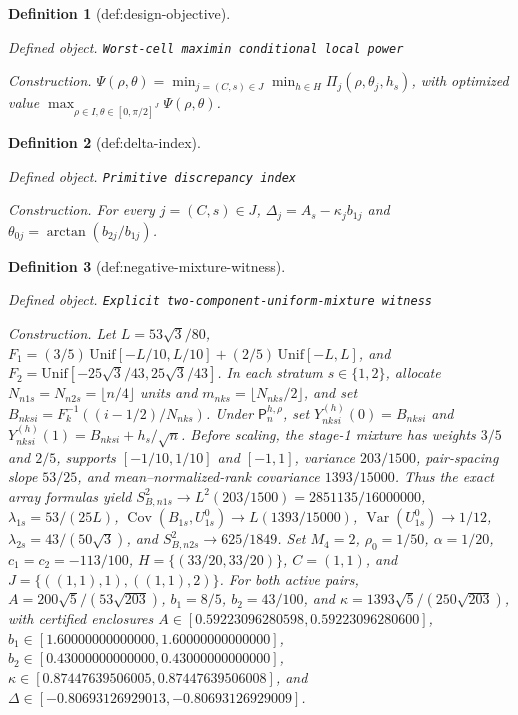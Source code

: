 \documentclass{article}
\newtheorem{definition}{Definition}
\begin{document}
\begin{definition}[def:design-objective]\label{def:design-objective}
\par\smallskip\noindent\emph{Defined object.} \texttt{Worst-\allowbreak{}cell maximin conditional local power}
\par\smallskip\noindent\emph{Construction.} \(\Psi(\rho,\theta)=\min_{j=(C,s)\in J}\min_{h\in H}\Pi_j(\rho,\theta_j,h_s)\), with optimized value \(\max_{\rho\in I,\theta\in[0,\pi/2]^J}\Psi(\rho,\theta)\).
\end{definition}

\begin{definition}[def:delta-index]\label{def:delta-index}
\par\smallskip\noindent\emph{Defined object.} \texttt{Primitive discrepancy index}
\par\smallskip\noindent\emph{Construction.} For every \(j=(C,s)\in J\), \(\Delta_j=A_s-\kappa_jb_{1j}\) and \(\theta_{0j}=\arctan(b_{2j}/b_{1j})\).
\end{definition}

\begin{definition}[def:negative-mixture-witness]\label{def:negative-mixture-witness}
\par\smallskip\noindent\emph{Defined object.} \texttt{Explicit two-\allowbreak{}component-\allowbreak{}uniform-\allowbreak{}mixture witness}
\par\smallskip\noindent\emph{Construction.} Let \(L=53\sqrt3/80\), \(F_1=(3/5)\,\mathrm{Unif}[-L/10,L/10]+(2/5)\,\mathrm{Unif}[-L,L]\), and \(F_2=\mathrm{Unif}[-25\sqrt3/43,25\sqrt3/43]\). In each stratum \(s\in\{1,2\}\), allocate \(N_{n1s}=N_{n2s}=\lfloor n/4\rfloor\) units and \(m_{nks}=\lfloor N_{nks}/2\rfloor\), and set \(B_{nksi}=F_k^{-1}((i-1/2)/N_{nks})\). Under \(\mathsf P_n^{h,\rho}\), set \(Y^{(h)}_{nksi}(0)=B_{nksi}\) and \(Y^{(h)}_{nksi}(1)=B_{nksi}+h_s/\sqrt n\). Before scaling, the stage-1 mixture has weights \(3/5\) and \(2/5\), supports \([-1/10,1/10]\) and \([-1,1]\), variance \(203/1500\), pair-spacing slope \(53/25\), and mean--normalized-rank covariance \(1393/15000\). Thus the exact array formulas yield \(S^2_{B,n1s}\to L^2(203/1500)=2851135/16000000\), \(\lambda_{1s}=53/(25L)\), \(\operatorname{Cov}(B_{1s},U^0_{1s})\to L(1393/15000)\), \(\operatorname{Var}(U^0_{1s})\to1/12\), \(\lambda_{2s}=43/(50\sqrt3)\), and \(S^2_{B,n2s}\to625/1849\). Set \(M_4=2\), \(\rho_0=1/50\), \(\alpha=1/20\), \(c_1=c_2=-113/100\), \(H=\{(33/20,33/20)\}\), \(C=(1,1)\), and \(J=\{((1,1),1),((1,1),2)\}\). For both active pairs, \(A=200\sqrt5/(53\sqrt{203})\), \(b_1=8/5\), \(b_2=43/100\), and \(\kappa=1393\sqrt5/(250\sqrt{203})\), with certified enclosures \(A\in[0.59223096280598,0.59223096280600]\), \(b_1\in[1.60000000000000,1.60000000000000]\), \(b_2\in[0.43000000000000,0.43000000000000]\), \(\kappa\in[0.87447639506005,0.87447639506008]\), and \(\Delta\in[-0.80693126929013,-0.80693126929009]\).
\end{definition}
\end{document}

